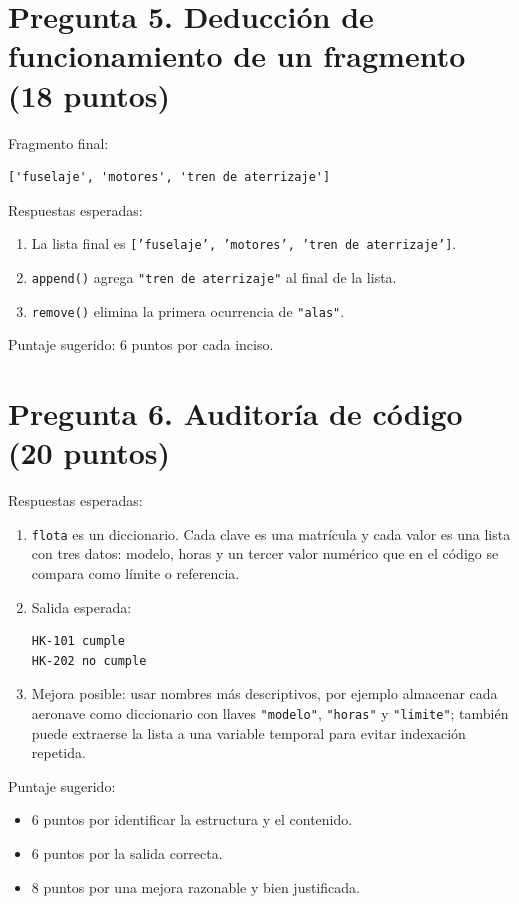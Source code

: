 \documentclass[12pt]{article}
\begin{document}
\section*{Pregunta 5. Deducci\'on de funcionamiento de un fragmento (18 puntos)}
Fragmento final:
\begin{verbatim}
['fuselaje', 'motores', 'tren de aterrizaje']
\end{verbatim}
Respuestas esperadas:
\begin{enumerate}[leftmargin=1.3em]
    \item La lista final es \texttt{['fuselaje', 'motores', 'tren de aterrizaje']}. 
    \item \texttt{append()} agrega \texttt{"tren de aterrizaje"} al final de la lista.
    \item \texttt{remove()} elimina la primera ocurrencia de \texttt{"alas"}.
\end{enumerate}
Puntaje sugerido: 6 puntos por cada inciso.

\section*{Pregunta 6. Auditor\'ia de c\'odigo (20 puntos)}
Respuestas esperadas:
\begin{enumerate}[leftmargin=1.3em]
    \item \texttt{flota} es un diccionario. Cada clave es una matr\'icula y cada valor es una lista con tres datos: modelo, horas y un tercer valor num\'erico que en el c\'odigo se compara como l\'imite o referencia.
    \item Salida esperada:
\begin{verbatim}
HK-101 cumple
HK-202 no cumple
\end{verbatim}
    \item Mejora posible: usar nombres m\'as descriptivos, por ejemplo almacenar cada aeronave como diccionario con llaves \texttt{"modelo"}, \texttt{"horas"} y \texttt{"limite"}; tambi\'en puede extraerse la lista a una variable temporal para evitar indexaci\'on repetida.
\end{enumerate}
Puntaje sugerido:
\begin{itemize}[leftmargin=1.2em]
    \item 6 puntos por identificar la estructura y el contenido.
    \item 6 puntos por la salida correcta.
    \item 8 puntos por una mejora razonable y bien justificada.
\end{itemize}
\end{document}
